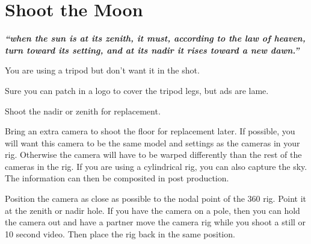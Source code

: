 \section{Shoot the Moon}
\pagecolor{white}
\label{chap:13}
\begin{fullwidth}

{\itshape\bfseries “when the sun is at its zenith, it must, according to the law of heaven, turn toward its setting, and at its nadir it rises toward a new dawn.”}

\vspace{\baselineskip}

\problem

{\large You are using a tripod but don’t want it in the shot. \par}

Sure you can patch in a logo to cover the tripod legs, but ads are lame. 


\solution

{\large Shoot the nadir or zenith for replacement. \par}

Bring an extra camera to shoot the floor for replacement later. If possible, you will want this camera to be the same model and settings as the cameras in your rig. Otherwise the camera will have to be warped differently than the rest of the cameras in the rig. If you are using a cylindrical rig, you can also capture the sky. The information can then be composited in post production.

Position the camera as close as possible to the nodal point of the 360 rig. Point it at the zenith or nadir hole. If you have the camera on a pole, then you can hold the camera out and have a partner move the camera rig while you shoot a still or 10 second video. Then place the rig back in the same position. 




\clearpage
\end{fullwidth}
